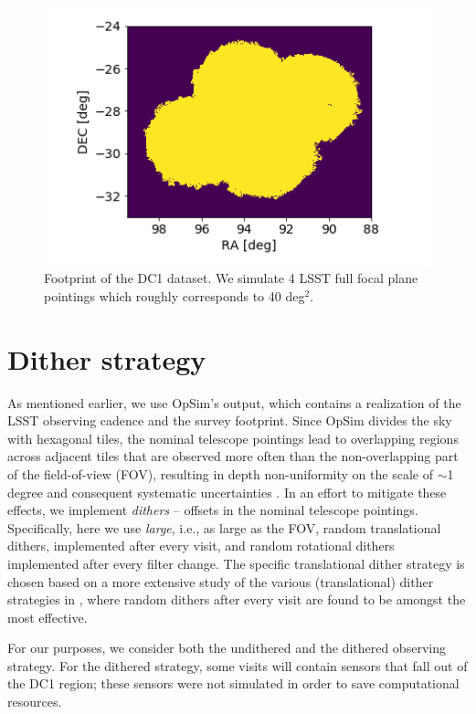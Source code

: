 \documentclass[twocolumn]{aastex62}
\begin{document}
\begin{figure}
\centering
\includegraphics[width=0.9\columnwidth]{footprint.png}
\caption{Footprint of the DC1 dataset. We simulate 4 LSST full focal plane pointings which roughly corresponds to 40 deg$^{2}$.}
\label{fig:footprint}
\end{figure}

\section{Dither strategy}
\label{sec:dithering}

As mentioned earlier, we use OpSim's output, which contains a realization of the LSST observing cadence and the survey footprint. Since OpSim divides the sky with hexagonal tiles, the nominal telescope pointings lead to overlapping regions across adjacent tiles that are observed more often than the non-overlapping part of the field-of-view (FOV), resulting in depth non-uniformity on the scale of $\sim$1 degree and consequent systematic uncertainties \citep{2016ApJ...829...50A}. In an effort to mitigate these effects, we implement \textit{dithers} -- offsets in the nominal telescope pointings. Specifically, here we use \textit{large}, i.e., as large as the FOV, random translational dithers, implemented after every visit, and random rotational dithers implemented after every filter change. The specific translational dither strategy is chosen based on a more extensive study of the various (translational) dither strategies in \citet{2016ApJ...829...50A}, where random dithers after every visit are found to be amongst the most effective.

For our purposes, we consider both the undithered and the dithered observing strategy. For the dithered strategy, some visits will contain sensors that fall out of the DC1 region; these sensors were not simulated in order to save computational resources.
\end{document}

